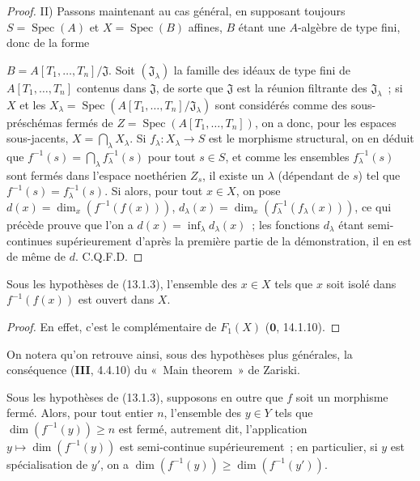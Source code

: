 \begin{proof}
II) Passons maintenant au cas général, en supposant toujours
$S=\operatorname{Spec}(A)$ et $X=\operatorname{Spec}(B)$ affines, $B$ étant
une $A$-algèbre de type fini, donc de la forme

$B=A[T_1,\ldots,T_n]/\mathfrak J$. Soit $(\mathfrak J_\lambda)$ la famille des
idéaux de type fini de $A[T_1,\ldots,T_n]$ contenus dans $\mathfrak J$, de
sorte que $\mathfrak J$ est la réunion filtrante des $\mathfrak J_\lambda$~;
si $X$ et les
$X_\lambda=\operatorname{Spec}(A[T_1,\ldots,T_n]/\mathfrak J_\lambda)$ sont
considérés comme des sous-préschémas fermés de
$Z=\operatorname{Spec}(A[T_1,\ldots,T_n])$, on a donc, pour les espaces
sous-jacents, $X=\bigcap_\lambda X_\lambda$. Si $f_\lambda:X_\lambda\to S$ est
le morphisme structural, on en déduit que
$f^{-1}(s)=\bigcap_\lambda f_\lambda^{-1}(s)$ pour tout $s\in S$, et comme les
ensembles $f_\lambda^{-1}(s)$ sont fermés dans l'espace noethérien $Z_s$, il
existe un $\lambda$ (dépendant de $s$) tel que
$f^{-1}(s)=f_\lambda^{-1}(s)$. Si alors, pour tout $x\in X$, on pose
$d(x)=\dim_x(f^{-1}(f(x)))$, $d_\lambda(x)=\dim_x(f_\lambda^{-1}(f_\lambda(x)))$,
ce qui précède prouve que l'on a $d(x)=\inf_\lambda d_\lambda(x)$~; les
fonctions $d_\lambda$ étant semi-continues supérieurement d'après la première
partie de la démonstration, il en est de même de $d$. C.Q.F.D.
\end{proof}

\begin{corollary}[13.1.4]
Sous les hypothèses de (13.1.3), l'ensemble des $x\in X$ tels que $x$ soit
isolé dans $f^{-1}(f(x))$ est ouvert dans $X$.
\end{corollary}

\begin{proof}
En effet, c'est le complémentaire de $F_1(X)$ ($\mathbf 0$, 14.1.10).
\end{proof}

On notera qu'on retrouve ainsi, sous des hypothèses plus générales, la
conséquence (\textbf{III}, 4.4.10) du «~Main theorem~» de Zariski.

\begin{corollary}[13.1.5]
\label{IV.13.1.5-fr}
Sous les hypothèses de (13.1.3), supposons en outre que $f$ soit un morphisme
fermé. Alors, pour tout entier $n$, l'ensemble des $y\in Y$ tels que
$\dim(f^{-1}(y))\geq n$ est fermé, autrement dit, l'application
$y\mapsto\dim(f^{-1}(y))$ est semi-continue supérieurement~; en particulier,
si $y$ est spécialisation de $y'$, on a
$\dim(f^{-1}(y))\geq\dim(f^{-1}(y'))$.
\end{corollary}

